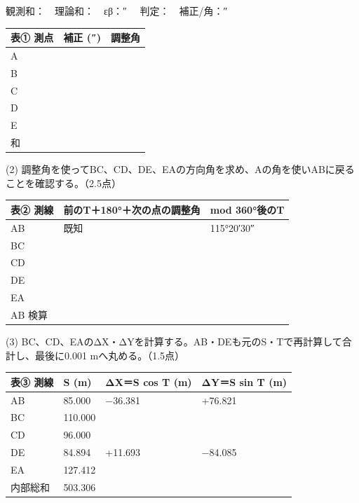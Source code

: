 \documentclass[a4paper,10pt]{article}
\begin{document}
{\small 観測和：\underline{\hspace{28mm}}　理論和：\underline{\hspace{20mm}}　εβ：\underline{\hspace{14mm}}″
　判定：\underline{\hspace{15mm}}　補正/角：\underline{\hspace{15mm}}″}
\begin{center}\small\begin{tabular}{|p{22mm}|p{32mm}|p{70mm}|}
\hline
\textbf{表① 測点} & \textbf{補正 (″)} & \textbf{調整角} \\ \hline
A &  &  \\ \hline
B &  &  \\ \hline
C &  &  \\ \hline
D &  &  \\ \hline
E &  &  \\ \hline
和 &  &  \\ \hline
\end{tabular}\end{center}{\small (2) 調整角を使ってBC、CD、DE、EAの方向角を求め、Aの角を使いABに戻ることを確認する。（2.5点）}
\begin{center}\small\begin{tabular}{|p{22mm}|p{87mm}|p{37mm}|}
\hline
\textbf{表② 測線} & \textbf{前のT＋180°＋次の点の調整角} & \textbf{mod 360°後のT} \\ \hline
AB & 既知 & 115°20′30″ \\ \hline
BC &  &  \\ \hline
CD &  &  \\ \hline
DE &  &  \\ \hline
EA &  &  \\ \hline
AB 検算 &  &  \\ \hline
\end{tabular}\end{center}{\small (3) BC、CD、EAのΔX・ΔYを計算する。AB・DEも元のS・Tで再計算して合計し、最後に0.001 mへ丸める。（1.5点）}
\begin{center}\small\begin{tabular}{|p{22mm}|p{26mm}|p{43mm}|p{43mm}|}
\hline
\textbf{表③ 測線} & \textbf{S (m)} & \textbf{ΔX＝S cos T (m)} & \textbf{ΔY＝S sin T (m)} \\ \hline
AB & 85.000 & −36.381 & +76.821 \\ \hline
BC & 110.000 &  &  \\ \hline
CD & 96.000 &  &  \\ \hline
DE & 84.894 & +11.693 & −84.085 \\ \hline
EA & 127.412 &  &  \\ \hline
内部総和 & 503.306 &  &  \\ \hline
\end{tabular}\end{center}\newpage
\end{document}
